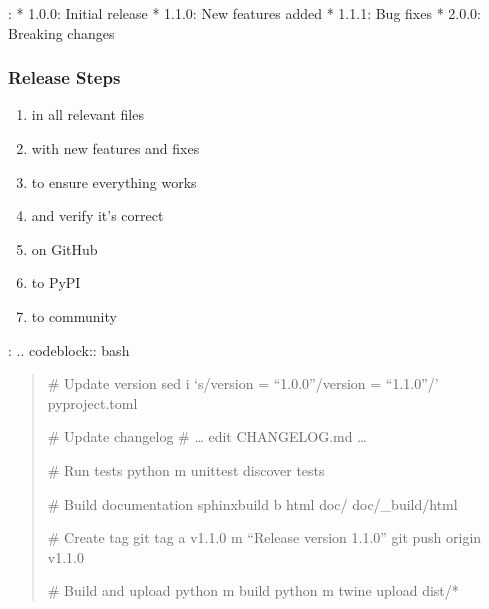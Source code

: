 \documentclass[a4paper,10pt,english,openany,oneside]{sphinxmanual}
\begin{document}
\sphinxAtStartPar
{}:
* 1.0.0: Initial release
* 1.1.0: New features added
* 1.1.1: Bug fixes
* 2.0.0: Breaking changes


\subsubsection{Release Steps}
\label{\detokenize{development:release-steps}}\begin{enumerate}
%
\item {} 
\sphinxAtStartPar
{} in all relevant files

\item {} 
\sphinxAtStartPar
{} with new features and fixes

\item {} 
\sphinxAtStartPar
{} to ensure everything works

\item {} 
\sphinxAtStartPar
{} and verify it’s correct

\item {} 
\sphinxAtStartPar
{} on GitHub

\item {} 
\sphinxAtStartPar
{} to PyPI

\item {} 
\sphinxAtStartPar
{} to community

\end{enumerate}

\sphinxAtStartPar
{}:
.. code\sphinxhyphen{}block:: bash
\begin{quote}

\sphinxAtStartPar
\# Update version
sed \sphinxhyphen{}i ‘s/version = “1.0.0”/version = “1.1.0”/’ pyproject.toml

\sphinxAtStartPar
\# Update changelog
\# … edit CHANGELOG.md …

\sphinxAtStartPar
\# Run tests
python \sphinxhyphen{}m unittest discover tests

\sphinxAtStartPar
\# Build documentation
sphinx\sphinxhyphen{}build \sphinxhyphen{}b html doc/ doc/\_build/html

\sphinxAtStartPar
\# Create tag
git tag \sphinxhyphen{}a v1.1.0 \sphinxhyphen{}m “Release version 1.1.0”
git push origin v1.1.0

\sphinxAtStartPar
\# Build and upload
python \sphinxhyphen{}m build
python \sphinxhyphen{}m twine upload dist/*
\end{quote}
\end{document}
